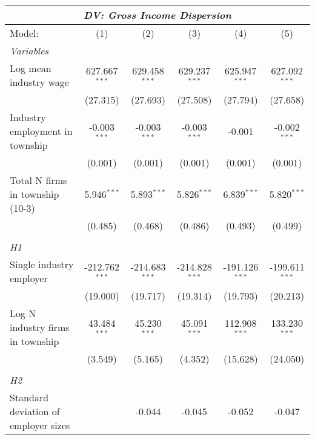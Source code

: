 \begingroup
\centering
\begin{tabular}{lccccc}
   \tabularnewline \multicolumn{6}{c}{\textit{DV: Gross Income Dispersion}} \\ \midrule \midrule
   Model:                               & (1)              & (2)              & (3)              & (4)              & (5)\\  
   \midrule
   \emph{Variables}\\
   Log mean industry wage               & 627.667$^{***}$  & 629.458$^{***}$  & 629.237$^{***}$  & 625.947$^{***}$  & 627.092$^{***}$\\   
                                        & (27.315)         & (27.693)         & (27.508)         & (27.794)         & (27.658)\\   
   Industry employment in township      & -0.003$^{***}$   & -0.003$^{***}$   & -0.003$^{***}$   & -0.001           & -0.002$^{***}$\\   
                                        & (0.001)          & (0.001)          & (0.001)          & (0.001)          & (0.001)\\   
   Total N firms in township (10-3)     & 5.946$^{***}$    & 5.893$^{***}$    & 5.826$^{***}$    & 6.839$^{***}$    & 5.820$^{***}$\\   
                                        & (0.485)          & (0.468)          & (0.486)          & (0.493)          & (0.499)\\   
\hdashline %
\\[0.1ex] %
\emph{H1} \\ 
   Single industry employer             & -212.762$^{***}$ & -214.683$^{***}$ & -214.828$^{***}$ & -191.126$^{***}$ & -199.611$^{***}$\\   
                                        & (19.000)         & (19.717)         & (19.314)         & (19.793)         & (20.213)\\   
   Log N industry firms in township     & 43.484$^{***}$   & 45.230$^{***}$   & 45.091$^{***}$   & 112.908$^{***}$  & 133.230$^{***}$\\   
                                        & (3.549)          & (5.165)          & (4.352)          & (15.628)         & (24.050)\\   
\hdashline %
\\[0.1ex] %
\emph{H2} \\ 
   Standard deviation of employer sizes &                  & -0.044           & -0.045           & -0.052           & -0.047\\   

\end{tabular}
